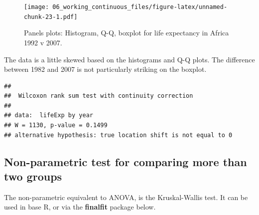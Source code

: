 \documentclass[
  12pt,
  krantz2]{krantz}
\makeatletter
\newenvironment{Shaded}{\begin{snugshade}}{\end{snugshade}}
\newcommand{\DataTypeTok}[1]{\textcolor[rgb]{0.13,0.29,0.53}{#1}}
\newcommand{\DecValTok}[1]{\textcolor[rgb]{0.00,0.00,0.81}{#1}}
\newcommand{\KeywordTok}[1]{\textcolor[rgb]{0.13,0.29,0.53}{\textbf{#1}}}
\newcommand{\NormalTok}[1]{#1}
\newcommand{\OperatorTok}[1]{\textcolor[rgb]{0.81,0.36,0.00}{\textbf{#1}}}
\newcommand{\StringTok}[1]{\textcolor[rgb]{0.31,0.60,0.02}{#1}}
\newenvironment{kframe}{%
\medskip{}
\setlength{\fboxsep}{.8em}
 \def\at@end@of@kframe{}%
 \ifinner\ifhmode%
  \def\at@end@of@kframe{\end{minipage}}%
  \begin{minipage}{\columnwidth}%
 \fi\fi%
 \def\FrameCommand##1{\hskip\@totalleftmargin \hskip-\fboxsep
 \colorbox{shadecolor}{##1}\hskip-\fboxsep
     \hskip-\linewidth \hskip-\@totalleftmargin \hskip\columnwidth}%
 \MakeFramed {\advance\hsize-\width
   \@totalleftmargin\z@ \linewidth\hsize
   \@setminipage}}%
 {\par\unskip\endMakeFramed%
 \at@end@of@kframe}
\renewenvironment{Shaded}{\begin{kframe}}{\end{kframe}}
\makeatother
\begin{document}
\begin{figure}
\centering
\texttt{[image: 06\_working\_continuous\_files/figure-latex/unnamed-chunk-23-1.pdf]}
\caption{\label{fig:unnamed-chunk-23}Panels plots: Histogram, Q-Q, boxplot for life expectancy in Africa 1992 v 2007.}
\end{figure}


The data is a little skewed based on the histograms and Q-Q plots.
The difference between 1982 and 2007 is not particularly striking on the boxplot.

\begin{Shaded}
\end{Shaded}

\begin{verbatim}
## 
##  Wilcoxon rank sum test with continuity correction
## 
## data:  lifeExp by year
## W = 1130, p-value = 0.1499
## alternative hypothesis: true location shift is not equal to 0
\end{verbatim}


\hypertarget{non-parametric-test-for-comparing-more-than-two-groups}{%
\subsection{Non-parametric test for comparing more than two groups}\label{non-parametric-test-for-comparing-more-than-two-groups}}


The non-parametric equivalent to ANOVA, is the Kruskal-Wallis test.
It can be used in base R, or via the \textbf{finalfit} package below.

\begin{Shaded}
\end{Shaded}
\end{document}
